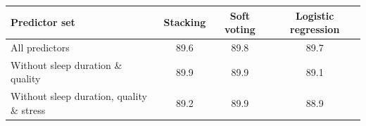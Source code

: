 \begin{tabular}{@{}lccc@{}}
\toprule
Predictor set & Stacking & Soft voting & Logistic regression\\
\midrule
All predictors & 89.6 & 89.8 & 89.7\\
Without sleep duration \& quality & 89.9 & 89.9 & 89.1\\
Without sleep duration, quality \& stress & 89.2 & 89.9 & 88.9\\
\bottomrule
\end{tabular}